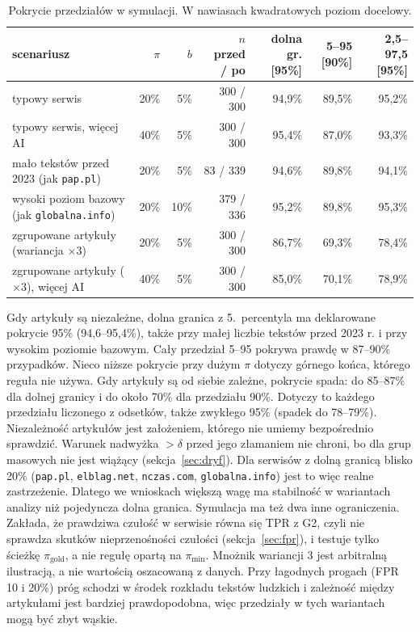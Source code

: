 \documentclass[11pt,a4paper]{article}
\newcommand{\pimin}{\ensuremath{\pi_{\mathrm{min}}}}
\newcommand{\pigold}{\ensuremath{\pi_{\mathrm{gold}}}}
\newcommand{\dom}[1]{\texttt{#1}}
\begin{document}
\begin{table}[t]
\centering\footnotesize\setlength{\tabcolsep}{3pt}
\caption{Pokrycie przedziałów w symulacji. W nawiasach kwadratowych poziom docelowy.}\label{tab:pokrycie_sym}
\begin{tabular}{@{}p{4.2cm}rrrrrr@{}}
\toprule
scenariusz & $\pi$ & $b$ & $n$ przed / po & dolna gr. [95\%] & 5--95 [90\%] & 2,5--97,5 [95\%] \\
\midrule
typowy serwis & 20\% & 5\% & 300 / 300 & 94,9\% & 89,5\% & 95,2\% \\
typowy serwis, więcej AI & 40\% & 5\% & 300 / 300 & 95,4\% & 87,0\% & 93,3\% \\
mało tekstów przed 2023 (jak \dom{pap.pl}) & 20\% & 5\% & 83 / 339 & 94,6\% & 89,8\% & 94,1\% \\
wysoki poziom bazowy (jak \dom{globalna.info}) & 20\% & 10\% & 379 / 336 & 95,2\% & 89,8\% & 95,3\% \\
zgrupowane artykuły (wariancja $\times 3$) & 20\% & 5\% & 300 / 300 & 86,7\% & 69,3\% & 78,4\% \\
zgrupowane artykuły ($\times 3$), więcej AI & 40\% & 5\% & 300 / 300 & 85,0\% & 70,1\% & 78,9\% \\
\bottomrule
\end{tabular}
\end{table}

Gdy artykuły są niezależne, dolna granica z 5.\ percentyla ma deklarowane pokrycie 95\% (94,6--95,4\%), także przy małej liczbie tekstów przed 2023 r. i przy wysokim poziomie bazowym. Cały przedział 5--95 pokrywa prawdę w 87--90\% przypadków. Nieco niższe pokrycie przy dużym $\pi$ dotyczy górnego końca, którego reguła nie używa. Gdy artykuły są od siebie zależne, pokrycie spada: do 85--87\% dla dolnej granicy i do około 70\% dla przedziału 90\%. Dotyczy to każdego przedziału liczonego z odsetków, także zwykłego 95\% (spadek do 78--79\%). Niezależność artykułów jest założeniem, którego nie umiemy bezpośrednio sprawdzić. Warunek nadwyżka $>\delta$ przed jego złamaniem nie chroni, bo dla grup masowych nie jest wiążący (sekcja~\ref{sec:dryf}). Dla serwisów z dolną granicą blisko 20\% (\dom{pap.pl}, \dom{elblag.net}, \dom{nczas.com}, \dom{globalna.info}) jest to więc realne zastrzeżenie. Dlatego we wnioskach większą wagę ma stabilność w wariantach analizy niż pojedyncza dolna granica. Symulacja ma też dwa inne ograniczenia. Zakłada, że prawdziwa czułość w serwisie równa się TPR z G2, czyli nie sprawdza skutków nieprzenośności czułości (sekcja~\ref{sec:fpr}), i testuje tylko ścieżkę \pigold{}, a nie regułę opartą na \pimin{}. Mnożnik wariancji 3 jest arbitralną ilustracją, a nie wartością oszacowaną z danych. Przy łagodnych progach (FPR 10 i 20\%) próg schodzi w środek rozkładu tekstów ludzkich i zależność między artykułami jest bardziej prawdopodobna, więc przedziały w tych wariantach mogą być zbyt wąskie.
\end{document}

